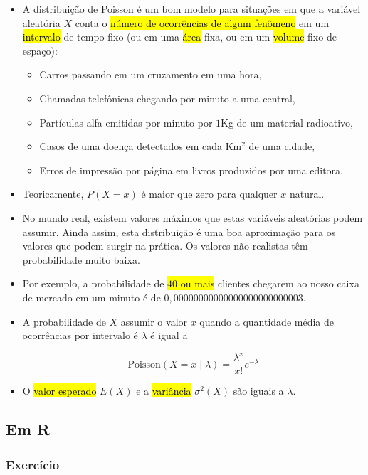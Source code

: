 \documentclass[
  11pt]{report}
\begin{document}
\begin{itemize}
\item
  A distribuição de Poisson é um bom modelo para situações em que a variável aleatória $X$ conta o {\hl{número de ocorrências de algum fenômeno}} em um {\hl{intervalo}} de tempo fixo (ou em uma {\hl{área}} fixa, ou em um {\hl{volume}} fixo de espaço):

  \begin{itemize}
  \item
    Carros passando em um cruzamento em uma hora,
  \item
    Chamadas telefônicas chegando por minuto a uma central,
  \item
    Partículas alfa emitidas por minuto por $1$Kg de um material radioativo,
  \item
    Casos de uma doença detectados em cada Km$^2$ de uma cidade,
  \item
    Erros de impressão por página em livros produzidos por uma editora.
  \end{itemize}
\item
  Teoricamente, $P(X=x)$ é maior que zero para qualquer $x$ natural.
\item
  No mundo real, existem valores máximos que estas variáveis aleatórias podem assumir. Ainda assim, esta distribuição é uma boa aproximação para os valores que podem surgir na prática. Os valores não-realistas têm probabilidade muito baixa.
\item
  Por exemplo, a probabilidade de {\hl{$40$ ou mais}} clientes chegarem ao nosso caixa de mercado em um minuto é de $0{,}00000000000000000000000003$.
\item
  A probabilidade de $X$ assumir o valor $x$ quando a quantidade média de ocorrências por intervalo é $\lambda$ é igual a

  \[
  \text{Poisson}(X = x \mid \lambda) = \frac{\lambda^{x}}{x!}e^{-\lambda}
  \]
\item
  O {\hl{valor esperado}} $E(X)$ e a {\hl{variância}} $\sigma^2(X)$ são iguais a $\lambda$.
\end{itemize}

\hypertarget{em-r-4}{%
\subsection{Em R}\label{em-r-4}}

\hypertarget{exercuxedcio-3}{%
\subsubsection*{Exercício}\label{exercuxedcio-3}}
\end{document}
